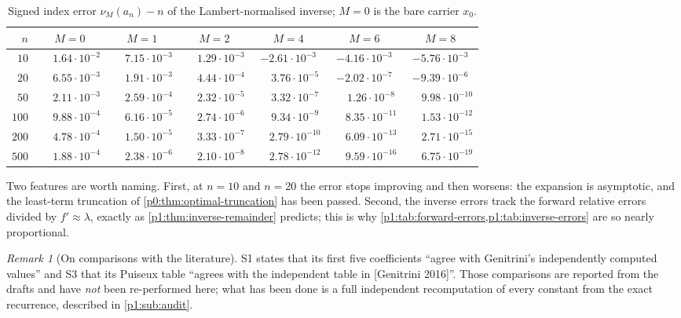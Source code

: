 \documentclass[11pt,a4paper,oneside]{book}
\theoremstyle{plain}
\theoremstyle{definition}
\theoremstyle{remark}
\newtheorem{remark}[theorem]{Remark}
\begin{document}
\begin{table}[htbp]
\centering
\caption{Signed index error $\nu_M(a_n)-n$ of the Lambert-normalised
inverse; $M=0$ is the bare carrier $x_0$.}
\label{p1:tab:inverse-errors}
\scriptsize
\setlength{\tabcolsep}{4pt}
\begin{tabular}{rcccccc}
\toprule
$n$ & $M=0$ & $M=1$ & $M=2$ & $M=4$ & $M=6$ & $M=8$\\
\midrule
$10$  & $\phantom{-}1.64\cdot10^{-2}$ & $\phantom{-}7.15\cdot10^{-3}$ & $\phantom{-}1.29\cdot10^{-3}$ & $-2.61\cdot10^{-3}$ & $-4.16\cdot10^{-3}$ & $-5.76\cdot10^{-3}$\\
$20$  & $\phantom{-}6.55\cdot10^{-3}$ & $\phantom{-}1.91\cdot10^{-3}$ & $\phantom{-}4.44\cdot10^{-4}$ & $\phantom{-}3.76\cdot10^{-5}$ & $-2.02\cdot10^{-7}$ & $-9.39\cdot10^{-6}$\\
$50$  & $\phantom{-}2.11\cdot10^{-3}$ & $\phantom{-}2.59\cdot10^{-4}$ & $\phantom{-}2.32\cdot10^{-5}$ & $\phantom{-}3.32\cdot10^{-7}$ & $\phantom{-}1.26\cdot10^{-8}$ & $\phantom{-}9.98\cdot10^{-10}$\\
$100$ & $\phantom{-}9.88\cdot10^{-4}$ & $\phantom{-}6.16\cdot10^{-5}$ & $\phantom{-}2.74\cdot10^{-6}$ & $\phantom{-}9.34\cdot10^{-9}$ & $\phantom{-}8.35\cdot10^{-11}$ & $\phantom{-}1.53\cdot10^{-12}$\\
$200$ & $\phantom{-}4.78\cdot10^{-4}$ & $\phantom{-}1.50\cdot10^{-5}$ & $\phantom{-}3.33\cdot10^{-7}$ & $\phantom{-}2.79\cdot10^{-10}$ & $\phantom{-}6.09\cdot10^{-13}$ & $\phantom{-}2.71\cdot10^{-15}$\\
$500$ & $\phantom{-}1.88\cdot10^{-4}$ & $\phantom{-}2.38\cdot10^{-6}$ & $\phantom{-}2.10\cdot10^{-8}$ & $\phantom{-}2.78\cdot10^{-12}$ & $\phantom{-}9.59\cdot10^{-16}$ & $\phantom{-}6.75\cdot10^{-19}$\\
\bottomrule
\end{tabular}
\end{table}

Two features are worth naming.  First, at $n=10$ and $n=20$ the error stops improving and then
worsens: the expansion is asymptotic, and the least-term truncation of
\cref{p0:thm:optimal-truncation} has been passed.  Second, the inverse errors track the
forward relative errors divided by $f'\approx\lambda$, exactly as
\cref{p1:thm:inverse-remainder} predicts; this is why
\cref{p1:tab:forward-errors,p1:tab:inverse-errors} are so nearly proportional.

\begin{remark}[On comparisons with the literature]
\label{p1:rem:genitrini}
\textsf{S1} states that its first five coefficients ``agree with Genitrini's independently
computed values'' and \textsf{S3} that its Puiseux table ``agrees with the independent table
in [Genitrini 2016]''.  Those comparisons are reported from the drafts and have \emph{not}
been re-performed here; what has been done is a full independent recomputation of every
constant from the exact recurrence, described in \cref{p1:sub:audit}.
\end{remark}
\end{document}
